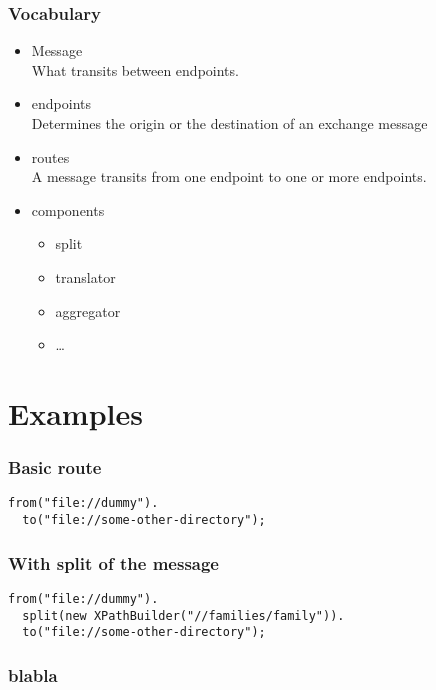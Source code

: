 \documentclass[bigger]{beamer}
\begin{document}
\begin{frame}
\frametitle{Vocabulary}
\label{sec-1-4}
\begin{itemize}

\item Message\\
\label{sec-1-4-1}%
What transits between endpoints.

\item endpoints\\
\label{sec-1-4-2}%
Determines the origin or the destination of an exchange message

\item routes\\
\label{sec-1-4-3}%
A message transits from one endpoint to one or more endpoints.

\item components
\label{sec-1-4-4}%
\begin{itemize}

\item split
\label{sec-1-4-4-1}%

\item translator
\label{sec-1-4-4-2}%

\item aggregator
\label{sec-1-4-4-3}%

\item \ldots{}
\label{sec-1-4-4-4}%
\end{itemize} %
\end{itemize} %
\end{frame}
\section{Examples}
\label{sec-2}
\begin{frame}[fragile]
\frametitle{Basic route}
\label{sec-2-1}


\begin{verbatim}
from("file://dummy").
  to("file://some-other-directory");
\end{verbatim}
\end{frame}
\begin{frame}[fragile]
\frametitle{With split of the message}
\label{sec-2-2}


\begin{verbatim}
from("file://dummy").
  split(new XPathBuilder("//families/family")).
  to("file://some-other-directory");
\end{verbatim}
\end{frame}
\begin{frame}
\frametitle{blabla}
\label{sec-2-3}
\end{frame}
\end{document}
